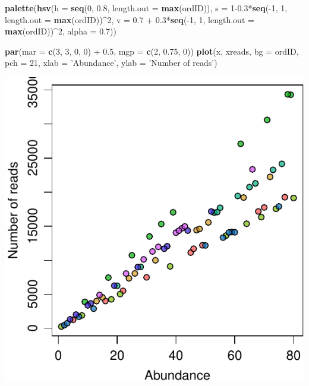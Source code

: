 \documentclass[]{article}
\newenvironment{Shaded}{\begin{snugshade}}{\end{snugshade}}
\newcommand{\KeywordTok}[1]{\textcolor[rgb]{0.13,0.29,0.53}{\textbf{{#1}}}}
\newcommand{\DataTypeTok}[1]{\textcolor[rgb]{0.13,0.29,0.53}{{#1}}}
\newcommand{\DecValTok}[1]{\textcolor[rgb]{0.00,0.00,0.81}{{#1}}}
\newcommand{\FloatTok}[1]{\textcolor[rgb]{0.00,0.00,0.81}{{#1}}}
\newcommand{\StringTok}[1]{\textcolor[rgb]{0.31,0.60,0.02}{{#1}}}
\newcommand{\NormalTok}[1]{{#1}}
\begin{document}
\begin{Shaded}
\begin{Highlighting}[]
\KeywordTok{palette}\NormalTok{(}\KeywordTok{hsv}\NormalTok{(}\DataTypeTok{h =} \KeywordTok{seq}\NormalTok{(}\DecValTok{0}\NormalTok{, }\FloatTok{0.8}\NormalTok{, }\DataTypeTok{length.out =} \KeywordTok{max}\NormalTok{(ordID)), }
            \DataTypeTok{s =} \DecValTok{1}\FloatTok{-0.3}\NormalTok{*}\KeywordTok{seq}\NormalTok{(-}\DecValTok{1}\NormalTok{, }\DecValTok{1}\NormalTok{, }\DataTypeTok{length.out =} \KeywordTok{max}\NormalTok{(ordID))^}\DecValTok{2}\NormalTok{, }
            \DataTypeTok{v =} \FloatTok{0.7} \NormalTok{+}\StringTok{ }\FloatTok{0.3}\NormalTok{*}\KeywordTok{seq}\NormalTok{(-}\DecValTok{1}\NormalTok{, }\DecValTok{1}\NormalTok{, }\DataTypeTok{length.out =} \KeywordTok{max}\NormalTok{(ordID))^}\DecValTok{2}\NormalTok{, }
            \DataTypeTok{alpha =} \FloatTok{0.7}\NormalTok{))}

\KeywordTok{par}\NormalTok{(}\DataTypeTok{mar =} \KeywordTok{c}\NormalTok{(}\DecValTok{3}\NormalTok{, }\DecValTok{3}\NormalTok{, }\DecValTok{0}\NormalTok{, }\DecValTok{0}\NormalTok{) +}\StringTok{ }\FloatTok{0.5}\NormalTok{, }\DataTypeTok{mgp =} \KeywordTok{c}\NormalTok{(}\DecValTok{2}\NormalTok{, }\FloatTok{0.75}\NormalTok{, }\DecValTok{0}\NormalTok{))}
\KeywordTok{plot}\NormalTok{(x, xreads, }\DataTypeTok{bg =} \NormalTok{ordID, }\DataTypeTok{pch =} \DecValTok{21}\NormalTok{, }
     \DataTypeTok{xlab =} \StringTok{'Abundance'}\NormalTok{, }\DataTypeTok{ylab =} \StringTok{'Number of reads'}\NormalTok{)}
\end{Highlighting}
\end{Shaded}

\begin{center}\includegraphics{modelDerivation_normPrior_files/figure-latex/fig_simAbund-1} \end{center}
\end{document}
